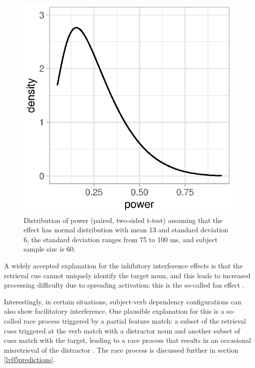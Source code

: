 \documentclass{cambridge7A}\usepackage[]{graphicx}\usepackage[]{color}
\makeatletter
\def\maxwidth{ %
  \ifdim\Gin@nat@width>\linewidth
    \linewidth
  \else
    \Gin@nat@width
  \fi
}
\newenvironment{knitrout}{}{} %
\makeatother
\begin{document}
\begin{figure}[!htbp]
\centering
\begin{knitrout}
\color{fgcolor}

{\centering \includegraphics[width=\maxwidth]{figures/fig-powercalcintvandyke-1} 

}



\end{knitrout}
\caption{Distribution of power (paired, two-sided t-test) assuming that the effect has normal distribution  with mean 13 and standard deviation 6, the standard deviation ranges from 75 to 100 ms, and subject sample size is 60.}\label{fig:powerdistrnvandyke}
\end{figure} 


A widely accepted explanation  for  the inhibitory interference effects  is that the retrieval cue cannot uniquely identify the target noun,  and this leads to increased processing difficulty due to  spreading activation; this is the so-called  fan effect \citep{AndersonEtAl2004}. 

Interestingly, in certain situations, subject-verb dependency configurations can also show facilitatory interference. One plausible explanation for this is a so-called  race process \citep{raab1962division} triggered by a  partial feature match: a subset of the retrieval cues triggered at the verb match with a distractor noun and another subset of cues match with the target, leading to a race process that results in an occasional  misretrieval of the distractor \citep{LogacevMultiple,NicenboimRetrieval2018}. The race process is discussed further in section \ref{lv05predictions}.
\end{document}
